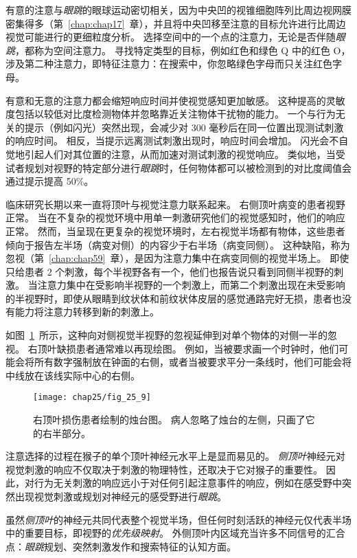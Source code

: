 有意的注意与\textit{眼跳}的眼球运动密切相关，因为中央凹的视锥细胞阵列比周边视网膜密集得多（第~\ref{chap:chap17}~章），并且将中央凹移至注意的目标允许进行比周边视觉可能进行的更细粒度分析。
选择空间中的一个点的注意力，无论是否伴随\textit{眼跳}，都称为空间注意力。
寻找特定类型的目标，例如红色和绿色 Q 中的红色 O，涉及第二种注意力，即特征注意力：在搜索中，你忽略绿色字母而只关注红色字母。


有意和无意的注意力都会缩短响应时间并使视觉感知更加敏感。
这种提高的灵敏度包括以较低对比度检测物体并忽略靠近关注物体干扰物的能力。
一个与行为无关的提示（例如闪光）突然出现，会减少对 300 毫秒后在同一位置出现测试刺激的响应时间。
相反，当提示远离测试刺激出现时，响应时间会增加。
闪光会不自觉地引起人们对其位置的注意，从而加速对测试刺激的视觉响应。
类似地，当受试者规划对视野的特定部分进行\textit{眼跳}时，任何物体都可以被检测到的对比度阈值会通过提示提高 50\%。


临床研究长期以来一直将顶叶与视觉注意力联系起来。
右侧顶叶病变的患者视野正常。
当在不复杂的视觉环境中用单一刺激研究他们的视觉感知时，他们的响应正常。
然而，当呈现在更复杂的视觉环境时，左右视觉半场都有物体，这些患者倾向于报告左半场（病变对侧）的内容少于右半场（病变同侧）。
这种缺陷，称为忽视（第~\ref{chap:chap59}~章），是因为注意力集中在病变同侧的视觉半场上。
即使只给患者 2 个刺激，每个半视野各有一个，他们也报告说只看到同侧半视野的刺激。
当注意力集中在受影响半视野的一个刺激上，而第二个刺激出现在未受影响的半视野时，即使从眼睛到纹状体和前纹状体皮层的感觉通路完好无损，患者也没有能力将注意力转移到新的刺激上。


如图~\ref{fig:25_9}~所示，这种向对侧视觉半视野的忽视延伸到对单个物体的对侧一半的忽视。
右顶叶缺损患者通常难以再现绘图。
例如，当被要求画一个时钟时，他们可能会将所有数字强制放在钟面的右侧，或者当被要求平分一条线时，他们可能会将中线放在该线实际中心的右侧。


\begin{figure}[htbp]
	\centering
	\texttt{[image: chap25/fig\_25\_9]}
	\caption{右顶叶损伤患者绘制的烛台图。
		病人忽略了烛台的左侧，只画了它的右半部分。}
	\label{fig:25_9}
\end{figure}


注意选择的过程在猴子的单个顶叶神经元水平上是显而易见的。
\textit{侧顶叶}神经元对视觉刺激的响应不仅取决于刺激的物理特性，还取决于它对猴子的重要性。
因此，对行为无关刺激的响应远小于对任何引起注意事件的响应，例如在感受野中突然出现视觉刺激或规划对神经元的感受野进行\textit{眼跳}。


虽然\textit{侧顶叶}的神经元共同代表整个视觉半场，但任何时刻活跃的神经元仅代表半场中的重要目标，即视野的\textit{优先级映射}。
外侧顶叶内区域充当许多不同信号的汇合点：\textit{眼跳}规划、突然刺激发作和搜索特征的认知方面。


